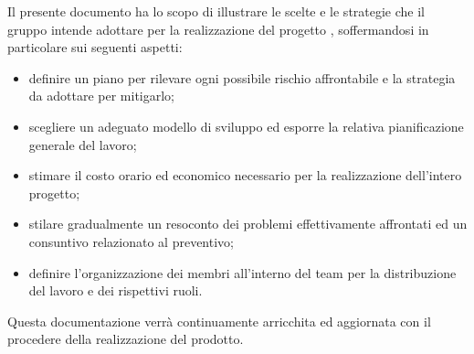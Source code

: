 Il presente documento ha lo scopo di illustrare le scelte e le strategie che il gruppo \Gruppo{} intende adottare per la realizzazione del progetto \NomeProgetto{}, soffermandosi in particolare sui seguenti aspetti:
    \begin{itemize}
        \item definire un piano per rilevare ogni possibile rischio affrontabile e la strategia da adottare per mitigarlo;
        \item scegliere un adeguato modello di sviluppo ed esporre la relativa pianificazione generale del lavoro;
        \item stimare il costo orario ed economico necessario per la realizzazione dell'intero progetto;
        \item stilare gradualmente un resoconto dei problemi effettivamente affrontati ed un consuntivo relazionato al preventivo;
        \item definire l'organizzazione dei membri all'interno del team per la distribuzione del lavoro e dei rispettivi ruoli.
    \end{itemize}

Questa documentazione verrà continuamente arricchita ed aggiornata con il procedere della realizzazione del prodotto.